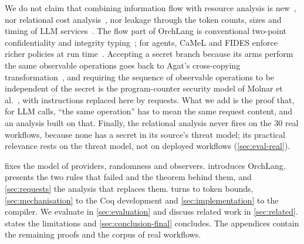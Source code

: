 We do not claim that combining information flow with resource analysis is
new~\cite{ngo2017verifying}, nor relational cost analysis~\cite{cicek2017relational},
nor leakage through the token counts, sizes and timing of LLM
services~\cite{weiss2024what,zhang2024time,mcdonald2025whisper,gu2025auditing}.
The flow part of OrchLang is conventional two-point confidentiality and integrity
typing~\cite{denning1976lattice,volpano1996sound}; for agents, CaMeL and FIDES
enforce richer policies at run time~\cite{debenedetti2026defeating,costa2025securing}.
Accepting a secret branch because its arms perform the same observable operations
goes back to Agat's cross-copying transformation~\cite{agat2000transforming}, and
requiring the sequence of observable operations to be independent of the secret is
the program-counter security model of Molnar et al.~\cite{molnar2006program}, with
instructions replaced here by requests. What we add is the proof that, for LLM
calls, ``the same operation'' has to mean the same request content, and an analysis
built on that. Finally, the relational analysis never fires on the 30
real workflows, because none has a secret in its source's threat model; its
practical relevance rests on the threat model, not on deployed workflows
(\cref{sec:eval-real}).

 fixes the model of providers, randomness and observers.
 introduces OrchLang.  presents the two rules
that failed and the theorem behind them, and \cref{sec:requests} the analysis that
replaces them.  turns to token bounds, \cref{sec:mechanisation}
to the Coq development and \cref{sec:implementation} to the compiler. We evaluate
in \cref{sec:evaluation} and discuss related work in \cref{sec:related}.
 states the limitations and \cref{sec:conclusion-final}
concludes. The appendices contain the remaining proofs and the corpus of real
workflows.
